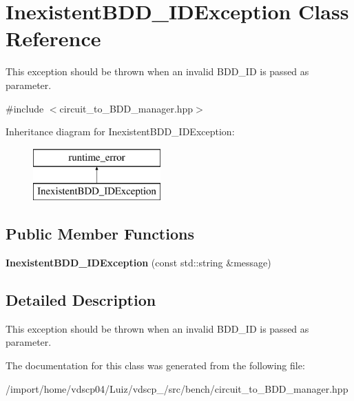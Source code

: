 \section{Inexistent\+B\+D\+D\+\_\+\+I\+D\+Exception Class Reference}
\label{classInexistentBDD__IDException}


This exception should be thrown when an invalid B\+D\+D\+\_\+\+ID is passed as parameter.  




{\ttfamily \#include $<$circuit\+\_\+to\+\_\+\+B\+D\+D\+\_\+manager.\+hpp$>$}

Inheritance diagram for Inexistent\+B\+D\+D\+\_\+\+I\+D\+Exception\+:\begin{figure}[H]
\begin{center}
\leavevmode
\includegraphics[height=2.000000cm]{classInexistentBDD__IDException}
\end{center}
\end{figure}
\subsection*{Public Member Functions}
\begin{DoxyCompactItemize}
\item 
{\bfseries Inexistent\+B\+D\+D\+\_\+\+I\+D\+Exception} (const std\+::string \&message)\label{classInexistentBDD__IDException_a574d927fc98d356d1ff18cef3d32ffb5}

\end{DoxyCompactItemize}


\subsection{Detailed Description}
This exception should be thrown when an invalid B\+D\+D\+\_\+\+ID is passed as parameter. 

The documentation for this class was generated from the following file\+:\begin{DoxyCompactItemize}
\item 
/import/home/vdscp04/\+Luiz/vdscp\+\_/src/bench/circuit\+\_\+to\+\_\+\+B\+D\+D\+\_\+manager.\+hpp\end{DoxyCompactItemize}
